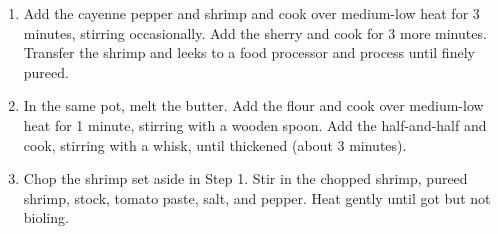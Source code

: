 \documentclass[11pt, twoside, openany]{book}
\begin{document}
\begin{minipage}[t]{\linewidth}
\begin{enumerate}
\item Add the cayenne pepper and shrimp and cook over medium-low heat for 3 minutes, stirring occasionally. Add the sherry and cook for 3 more minutes. Transfer the shrimp and leeks to a food processor and process until finely pureed.
\item In the same pot, melt the butter. Add the flour and cook over medium-low heat for 1 minute, stirring with a wooden spoon. Add the half-and-half and cook, stirring with a whisk, until thickened (about 3 minutes).
\item Chop the shrimp set aside in Step 1. Stir in the chopped shrimp, pureed shrimp, stock, tomato paste, salt, and pepper. Heat gently until got but not bioling.
\end{enumerate}
\end{minipage}\vspace{8mm}
\end{document}

